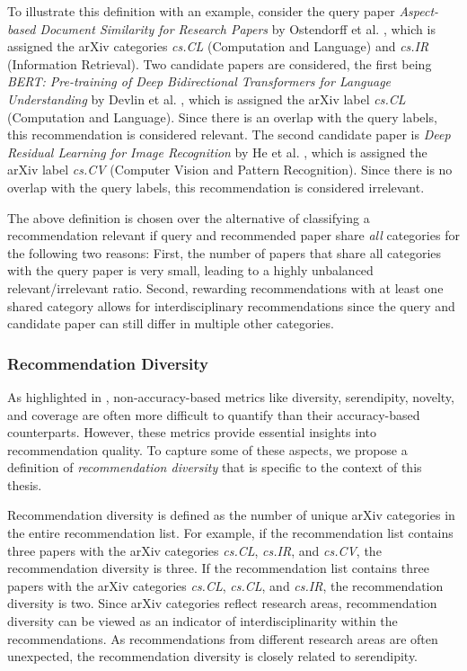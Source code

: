 To illustrate this definition with an example, consider the query paper \emph{Aspect-based Document Similarity for Research Papers} by Ostendorff et al. \cite{OstendorffAspectbasedDocument2020}, which is assigned the arXiv categories \emph{cs.CL} (Computation and Language) and \emph{cs.IR} (Information Retrieval).
Two candidate papers are considered, the first being \emph{BERT: Pre-training of Deep Bidirectional Transformers for Language Understanding} by Devlin et al. \cite{DevlinBERTPretraining2019}, which is assigned the arXiv label \emph{cs.CL} (Computation and Language). Since there is an overlap with the query labels, this recommendation is considered relevant. The second candidate paper is \emph{Deep Residual Learning for Image Recognition} by He et al. \cite{HeDeepResidual2015}, which is assigned the arXiv label \emph{cs.CV} (Computer Vision and Pattern Recognition). Since there is no overlap with the query labels, this recommendation is considered irrelevant.

The above definition is chosen over the alternative of classifying a recommendation relevant if query and recommended paper share \emph{all} categories for the following two reasons:
First, the number of papers that share all categories with the query paper is very small, leading to a highly unbalanced relevant/irrelevant ratio. Second, rewarding recommendations with at least one shared category allows for interdisciplinary recommendations since the query and candidate paper can still differ in multiple other categories.


\subsubsection*{Recommendation Diversity}

As highlighted in , non-accuracy-based metrics like diversity, serendipity, novelty, and coverage are often more difficult to quantify than their accuracy-based counterparts. However, these metrics provide essential insights into recommendation quality.
To capture some of these aspects, we propose a definition of \emph{recommendation diversity} that is specific to the context of this thesis.

Recommendation diversity is defined as the number of unique arXiv categories in the entire recommendation list. For example, if the recommendation list contains three papers with the arXiv categories \emph{cs.CL}, \emph{cs.IR}, and \emph{cs.CV}, the recommendation diversity is three. If the recommendation list contains three papers with the arXiv categories \emph{cs.CL}, \emph{cs.CL}, and \emph{cs.IR}, the recommendation diversity is two.
Since arXiv categories reflect research areas, recommendation diversity can be viewed as an indicator of interdisciplinarity within the recommendations.
As recommendations from different research areas are often unexpected, the recommendation diversity is closely related to serendipity.

